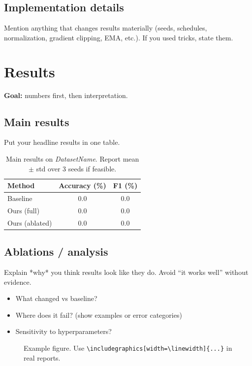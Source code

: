 \documentclass{article}
\begin{document}
\subsection{Implementation details}
Mention anything that changes results materially (seeds, schedules, normalization, gradient clipping, EMA, etc.).
If you used tricks, state them.

\section{Results}
\textbf{Goal:} numbers first, then interpretation.

\subsection{Main results}
Put your headline results in one table.

\begin{table}[t]
\centering
\caption{Main results on \textit{DatasetName}. Report mean $\pm$ std over 3 seeds if feasible.}
\label{tab:main_results}
\begin{tabular}{lcc}
\toprule
Method & Accuracy (\%) & F1 (\%) \\
\midrule
Baseline & 0.0 & 0.0 \\
Ours (full) & 0.0 & 0.0 \\
Ours (ablated) & 0.0 & 0.0 \\
\bottomrule
\end{tabular}
\end{table}

\subsection{Ablations / analysis}
Explain *why* you think results look like they do.
Avoid “it works well” without evidence.

\begin{itemize}
  \item What changed vs baseline?
  \item Where does it fail? (show examples or error categories)
  \item Sensitivity to hyperparameters?
\end{itemize}

\begin{figure}[t]
  \centering
  \fbox{\rule[-.5cm]{0cm}{3.2cm} \rule[-.5cm]{5.2cm}{0cm}}
  \caption{Example figure. Use \texttt{\textbackslash includegraphics[width=\textbackslash linewidth]\{...\}} in real reports.}
  \label{fig:architecture}
\end{figure}
\end{document}
